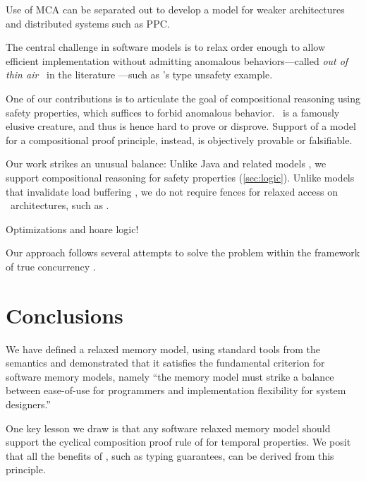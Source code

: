 Use of MCA can be separated out to develop a model for weaker architectures
and distributed systems such as PPC.

The central challenge in software models is to relax order enough to allow
efficient implementation without admitting anomalous behaviors---called
\emph{out of thin air} \oota\ in the literature
\cite{DBLP:conf/esop/BattyMNPS15,BoehmOOTA}---such as
\citeauthor{DBLP:journals/toplas/Lochbihler13}'s type unsafety example.

One of our contributions is to articulate the goal of compositional reasoning
using safety properties, which suffices to forbid anomalous behavior.  \oota\
is a famously elusive creature, and thus is hence hard to prove or disprove.
Support of a model for a compositional proof principle, instead, is
objectively provable or falsifiable.

Our work strikes an unusual balance: Unlike Java and related models
\cite{Manson:2005:JMM:1047659.1040336,DBLP:conf/esop/JagadeesanPR10,DBLP:conf/popl/KangHLVD17},
we support compositional reasoning for safety properties
(\textsection\ref{sec:logic}).  Unlike models that invalidate load buffering
\cite{Dolan:2018:BDR:3192366.3192421,BoehmOOTA,DBLP:conf/pldi/LahavVKHD17},
we do not require fences for relaxed access on \mca\ architectures, such as
\armeight.

Optimizations and hoare logic!

Our approach follows several attempts to solve the problem within the
framework of true concurrency
\cite{DBLP:conf/lics/JeffreyR16,Pichon-Pharabod:2016:CSR:2837614.2837616,DBLP:conf/esop/CenciarelliKS07}.










\section{Conclusions}
We have defined a relaxed memory model, using standard tools from the
semantics and demonstrated that it satisfies the fundamental criterion for
software memory models, namely ``the memory model must strike a balance
between ease-of-use for programmers and implementation flexibility for system
designers.''

One key lesson we draw is that any software relaxed memory model should
support the cyclical composition proof rule of
\citet{Abadi:1993:CS:151646.151649} for temporal properties.  We posit that all
the benefits of \oota, such as typing guarantees, can be derived from this
principle. 

